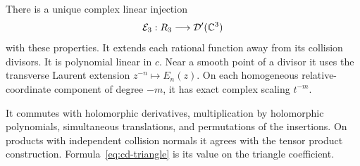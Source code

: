 \begin{theorem}
\label{thm:cd-three-extension}
There is a unique complex linear injection
\[
 \mathcal E_3:R_3\longrightarrow\mathcal D'(\mathbb C^3)
\]
with these properties.  It extends each rational function away from its
collision divisors.  It is polynomial linear in $c$.
Near a smooth point of a divisor it uses the transverse Laurent extension
$z^{-n}\mapsto E_n(z)$.  On each homogeneous relative-coordinate component
of degree $-m$, it has exact complex scaling $t^{-m}$.

It commutes with holomorphic derivatives, multiplication by holomorphic
polynomials, simultaneous translations, and permutations of the insertions.
On products with independent collision normals it agrees with the tensor
product construction.  Formula~\eqref{eq:cd-triangle} is its value on the
triangle coefficient.
\end{theorem}
